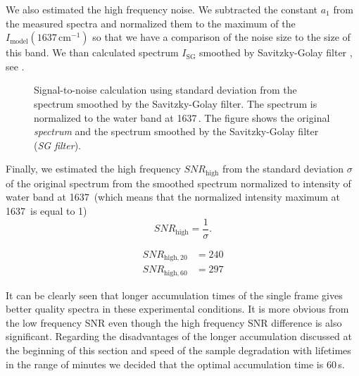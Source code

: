 We also estimated the high frequency noise. We subtracted the constant $a_1$
from the measured spectra and normalized them to the maximum of the
$I_\text{model}(1637\,\text{cm}^{-1})$
so that we have a comparison of the noise size to the size of this band. We
than calculated spectrum $I_\text{SG}$ smoothed by Savitzky-Golay filter
\parencite{Savitzky1964},
see
.

\begin{figure}
	\centering
	
	\caption{Signal-to-noise calculation using standard deviation from the
	  spectrum smoothed by the Savitzky-Golay filter. The spectrum is normalized
		to the water band at 1637\,\icm{}. The figure shows the original
		\emph{spectrum} and the spectrum smoothed by the Savitzky-Golay filter
		(\emph{SG filter}).}
	\label{\figlabel{accum_length:sn_ratio_sg}}
\end{figure}

Finally, we estimated the high frequency $SNR_\text{high}$ from the standard
deviation $\sigma$ of the original spectrum from the smoothed spectrum
normalized to intensity of water band at 1637\,\icm{} (which means that the
normalized intensity maximum at 1637\,\icm{} is equal to 1)
\begin{equation*}
	SNR_\text{high} = \frac{1}{\sigma}.
\end{equation*}

\begin{align*}
	SNR_{\text{high},20} &= 240 \\
	SNR_{\text{high},60} &= 297
\end{align*}

It can be clearly seen that longer accumulation times of the single frame gives
better quality spectra in these experimental conditions. It is more obvious
from the low frequency SNR even though the high frequency SNR difference is
also significant. Regarding the disadvantages of the
longer accumulation discussed at the beginning of this section and speed of
the sample degradation with lifetimes in the range of minutes we decided that
the optimal accumulation time is 60\,s.
